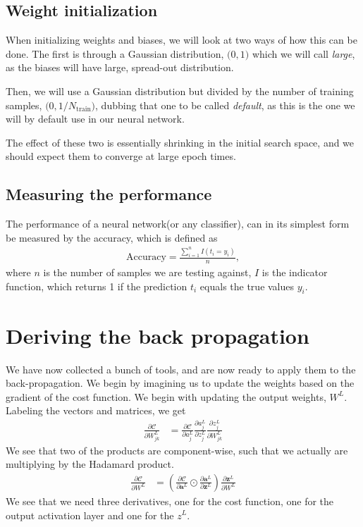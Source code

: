 \documentclass[a4paper,10pt]{article}
\newcommand{\pd}[2]{\frac{\partial {#1}}{\partial {#2}}}
\begin{document}
\subsection{Weight initialization} \label{sec:nn-weights}
When initializing weights and biases, we will look at two ways of how this can be done. The first is through a Gaussian distribution, $\mathcal(0, 1)$ which we will call \textit{large}, as the biases will have large, spread-out distribution.

Then, we will use a Gaussian distribution but divided by the number of training samples, $\mathcal(0, 1/{N_\mathrm{train}})$, dubbing that one to be called \textit{default}, as this is the one we will by default use in our neural network.

The effect of these two is essentially shrinking in the initial search space, and we should expect them to converge at large epoch times.

\subsection{Measuring the performance}
The performance of a neural network(or any classifier), can in its simplest form be measured by the accuracy, which is defined as
\begin{align}
    \mathrm{Accuracy} = \frac{\sum^{n}_{i=1}I(t_i = y_i)}{n},
    \label{eq:mlp-accuracy}
\end{align}
where $n$ is the number of samples we are testing against, $I$ is the indicator function, which returns 1 if the prediction $t_i$ equals the true values $y_i$.

\section{Deriving the back propagation}
We have now collected a bunch of tools, and are now ready to apply them to the back-propagation. We begin by imagining us to update the weights based on the gradient of the cost function. We begin with updating the output weights, $W^L$. Labeling the vectors and matrices, we get
\begin{align}
    \frac{\partial \mathcal{C}}{\partial W^L_{jk}} &= \pd{\mathcal{C}}{a^L_j}\pd{a^L_j}{z^L_j}\pd{z^L_j}{W^L_{jk}}
    \label{eq:backprop-vector-matrix-general-component-wise}
\end{align}
We see that two of the products are component-wise, such that we actually are multiplying by the Hadamard product.
\begin{align}
    \frac{\partial \mathcal{C}}{\partial W^L} &= \left(\pd{\mathcal{C}}{\bm{a}^L}\odot\pd{\bm{a}^L}{\bm{z}^L}\right) \pd{\bm{z}^L}{W^L}
    \label{eq:backprop-vector-matrix-general}
\end{align}
We see that we need three derivatives, one for the cost function, one for the output activation layer and one for the $z^L$. 
\end{document}
